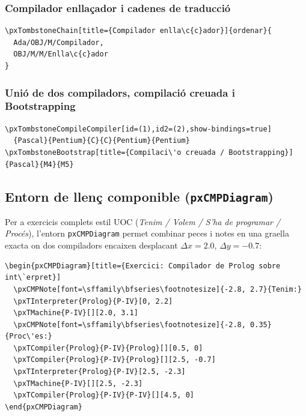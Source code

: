 \documentclass[11pt,a4paper]{article}
\begin{document}
\subsubsection*{Compilador enlla\c{c}ador i cadenes de traducci\'o}
\begin{verbatim}
\pxTombstoneChain[title={Compilador enlla\c{c}ador}]{ordenar}{
  Ada/OBJ/M/Compilador,
  OBJ/M/M/Enlla\c{c}ador
}
\end{verbatim}

\subsubsection*{Uni\'o de dos compiladors, compilaci\'o creuada i Bootstrapping}
\begin{verbatim}
\pxTombstoneCompileCompiler[id=(1),id2=(2),show-bindings=true]
  {Pascal}{Pentium}{C}{C}{Pentium}{Pentium}
\pxTombstoneBootstrap[title={Compilaci\'o creuada / Bootstrapping}]{Pascal}{M4}{M5}
\end{verbatim}


\subsection{Entorn de llen\c{c} componible (\texttt{pxCMPDiagram})}
Per a exercicis complets estil UOC (\emph{Tenim / Volem / S'ha de programar / Proc\'es}),
l'entorn \texttt{pxCMPDiagram} permet combinar peces i notes en una graella exacta on
dos compiladors encaixen desplacant $\Delta x = 2.0$, $\Delta y = -0.7$:

\begin{verbatim}
\begin{pxCMPDiagram}[title={Exercici: Compilador de Prolog sobre int\`erpret}]
  \pxCMPNote[font=\sffamily\bfseries\footnotesize]{-2.8, 2.7}{Tenim:}
  \pxTInterpreter{Prolog}{P-IV}[0, 2.2]
  \pxTMachine{P-IV}[][2.0, 3.1]
  \pxCMPNote[font=\sffamily\bfseries\footnotesize]{-2.8, 0.35}{Proc\'es:}
  \pxTCompiler{Prolog}{P-IV}{Prolog}[][0.5, 0]
  \pxTCompiler{Prolog}{P-IV}{Prolog}[][2.5, -0.7]
  \pxTInterpreter{Prolog}{P-IV}[2.5, -2.3]
  \pxTMachine{P-IV}[][2.5, -2.3]
  \pxTCompiler{Prolog}{P-IV}{P-IV}[][4.5, 0]
\end{pxCMPDiagram}
\end{verbatim}
\end{document}
